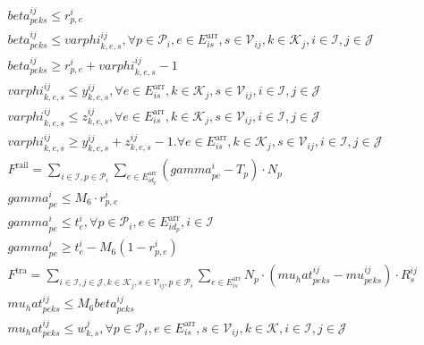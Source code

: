 \begin{align}
  & \mathit{beta}_{p e k s}^{i j} \leq r_{p , e}^{i} \tag{eq\_0078\_a} \\
  & \mathit{beta}_{p e k s}^{i j} \leq \mathit{varphi}_{k , e , s}^{i j} , \forall p \in \mathcal{P}_{i} , e \in E_{i s}^{\text{arr}} , s \in \mathcal{V}_{i j} , k \in \mathcal{K}_{j} , i \in \mathcal{I} , j \in \mathcal{J} \tag{eq\_0078\_b} \\
  & \mathit{beta}_{p e k s}^{i j} \geq r_{p , e}^{i} + \mathit{varphi}_{k , e , s}^{i j} - 1 \tag{eq\_0078\_c} \\
  & \mathit{varphi}_{k , e , s}^{i j} \leq y_{k , e , s}^{i j} , \forall e \in E_{i s}^{\text{arr}} , k \in \mathcal{K}_{j} , s \in \mathcal{V}_{i j} , i \in \mathcal{I} , j \in \mathcal{J} \tag{eq\_0079\_a} \\
  & \mathit{varphi}_{k , e , s}^{i j} \leq z_{k , e , s}^{i j} , \forall e \in E_{i s}^{\text{arr}} , k \in \mathcal{K}_{j} , s \in \mathcal{V}_{i j} , i \in \mathcal{I} , j \in \mathcal{J} \tag{eq\_0079\_b} \\
  & \mathit{varphi}_{k , e , s}^{i j} \geq y_{k , e , s}^{i j} + z_{k , e , s}^{i j} - 1 . \forall e \in E_{i s}^{\text{arr}} , k \in \mathcal{K}_{j} , s \in \mathcal{V}_{i j} , i \in \mathcal{I} , j \in \mathcal{J} \tag{eq\_0079\_c} \\
  & F^{\text{rail}} = \sum_{i \in \mathcal{I}, p \in \mathcal{P}_{i}} \underset{e \in E_{i d_{p}}^{\text{arr}}}{\sum} \left(\mathit{gamma}_{p e}^{i} - T_{p}\right) \cdot N_{p} \tag{eq\_0080} \\
  & \mathit{gamma}_{p e}^{i} \leq M_{6} \cdot r_{p , e}^{i} \tag{eq\_0082\_a} \\
  & \mathit{gamma}_{p e}^{i} \leq t_{e}^{i} , \forall p \in \mathcal{P}_{i} , e \in E_{i d_{p}}^{\text{arr}} , i \in \mathcal{I} \tag{eq\_0082\_b} \\
  & \mathit{gamma}_{p e}^{i} \geq t_{e}^{i} - M_{6} \left(1 - r_{p , e}^{i}\right) \tag{eq\_0082\_c} \\
  & F^{\text{tra}} = \sum_{i \in \mathcal{I}, j \in \mathcal{J}, k \in \mathcal{K}_{j}, s \in \mathcal{V}_{i j}, p \in \mathcal{P}_{i}} \underset{e \in E_{i s}^{\text{arr}}}{\sum} N_{p} \cdot \left(mu_hat_{p e k s}^{i j} - {\mathit{mu}}_{p e k s}^{i j}\right) \cdot R_{s}^{i j} \tag{eq\_0083} \\
  & mu_hat_{p e k s}^{i j} \leq M_{6} \mathit{beta}_{p e k s}^{i j} \tag{eq\_0085\_a} \\
  & mu_hat_{p e k s}^{i j} \leq w_{k , s}^{j} , \forall p \in \mathcal{P}_{i} , e \in E_{i s}^{\text{arr}} , s \in \mathcal{V}_{i j} , k \in \mathcal{K} , i \in \mathcal{I} , j \in \mathcal{J} \tag{eq\_0085\_b} \\

\end{align}
